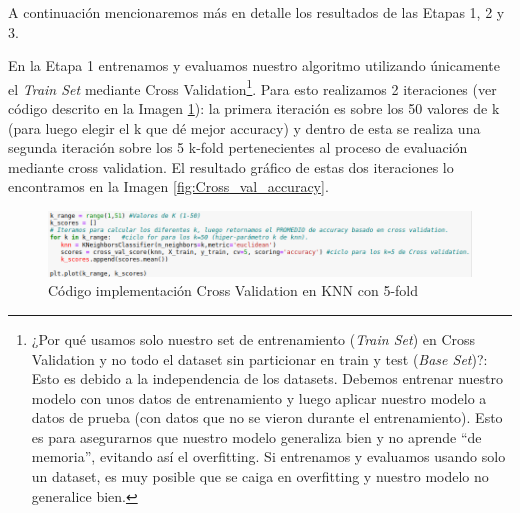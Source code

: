 \documentclass[12pt,a4paper]{article}
\begin{document}
\begin{sloppypar}
\cleardoublepage

A continuación mencionaremos más en detalle los resultados de las Etapas 1, 2 y 3.

En la Etapa 1 entrenamos y evaluamos nuestro algoritmo utilizando únicamente el \textit{Train Set} mediante Cross Validation\footnote{¿Por qué usamos solo nuestro set de entrenamiento (\textit{Train Set}) en Cross Validation y no todo el dataset sin particionar en train y test (\textit{Base Set})?: Esto es debido a la independencia de los datasets. Debemos entrenar nuestro modelo con unos datos de entrenamiento y luego aplicar nuestro modelo a datos de prueba (con datos que no se vieron durante el entrenamiento). Esto es para asegurarnos que nuestro modelo generaliza bien y no aprende “de memoria”, evitando así el overfitting. Si entrenamos y evaluamos usando solo un dataset, es muy posible que se caiga en overfitting y nuestro modelo no generalice bien.}. Para esto realizamos 2 iteraciones (ver código descrito en la Imagen \ref{fig:cross_val_code}): la primera iteración es sobre los 50 valores de k (para luego elegir el k que dé mejor accuracy) y dentro de esta se realiza una segunda iteración sobre los 5 k-fold pertenecientes al proceso de evaluación mediante cross validation. El resultado gráfico de estas dos iteraciones lo encontramos en la Imagen \ref{fig:Cross_val_accuracy}.

\begin{figure}[H]   
\centering
\includegraphics[width=1\textwidth]{images/implementacion_5/cross_val_code.png}
\caption[Código implementación Cross Validation en KNN con 5-fold.]{Código implementación Cross Validation en KNN con 5-fold\protect\footnotemark}
\label{fig:cross_val_code}
\end{figure}



\end{sloppypar}
\end{document}
